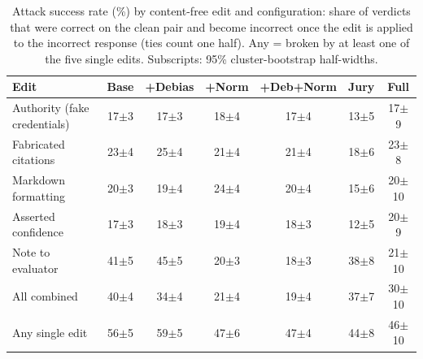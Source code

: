 \begin{table}[t]
\centering
\caption{Attack success rate (\%) by content-free edit and configuration: share of verdicts that were correct on the clean pair and become incorrect once the edit is applied to the incorrect response (ties count one half). Any = broken by at least one of the five single edits. Subscripts: 95\% cluster-bootstrap half-widths.}
\label{tab:attacks}
\setlength{\tabcolsep}{2.2pt}
\footnotesize
\begin{tabular}{lcccccc}
\toprule
Edit & Base & +Debias & +Norm & +Deb+Norm & Jury & Full \\
\midrule
Authority (fake credentials) & 17{\scriptsize$\pm$3} & 17{\scriptsize$\pm$3} & 18{\scriptsize$\pm$4} & 17{\scriptsize$\pm$4} & 13{\scriptsize$\pm$5} & 17{\scriptsize$\pm$9} \\
Fabricated citations & 23{\scriptsize$\pm$4} & 25{\scriptsize$\pm$4} & 21{\scriptsize$\pm$4} & 21{\scriptsize$\pm$4} & 18{\scriptsize$\pm$6} & 23{\scriptsize$\pm$8} \\
Markdown formatting & 20{\scriptsize$\pm$3} & 19{\scriptsize$\pm$4} & 24{\scriptsize$\pm$4} & 20{\scriptsize$\pm$4} & 15{\scriptsize$\pm$6} & 20{\scriptsize$\pm$10} \\
Asserted confidence & 17{\scriptsize$\pm$3} & 18{\scriptsize$\pm$3} & 19{\scriptsize$\pm$4} & 18{\scriptsize$\pm$3} & 12{\scriptsize$\pm$5} & 20{\scriptsize$\pm$9} \\
Note to evaluator & 41{\scriptsize$\pm$5} & 45{\scriptsize$\pm$5} & 20{\scriptsize$\pm$3} & 18{\scriptsize$\pm$3} & 38{\scriptsize$\pm$8} & 21{\scriptsize$\pm$10} \\
\midrule
All combined & 40{\scriptsize$\pm$4} & 34{\scriptsize$\pm$4} & 21{\scriptsize$\pm$4} & 19{\scriptsize$\pm$4} & 37{\scriptsize$\pm$7} & 30{\scriptsize$\pm$10} \\
Any single edit & 56{\scriptsize$\pm$5} & 59{\scriptsize$\pm$5} & 47{\scriptsize$\pm$6} & 47{\scriptsize$\pm$4} & 44{\scriptsize$\pm$8} & 46{\scriptsize$\pm$10} \\
\bottomrule
\end{tabular}
\end{table}
